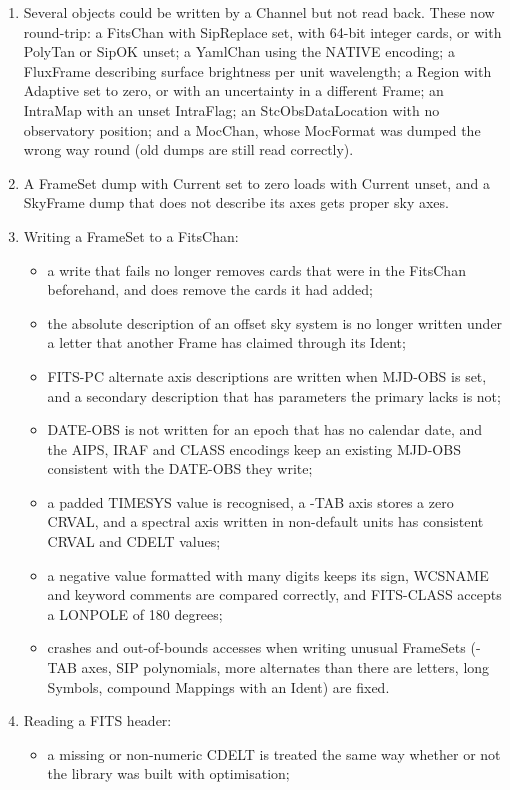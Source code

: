 \documentclass[twoside,11pt]{starlink}
\begin{document}
\begin{enumerate}
\item Several objects could be written by a Channel but not read back.
  These now round-trip: a FitsChan with SipReplace set, with 64-bit integer cards, or with PolyTan or SipOK unset; a YamlChan using the NATIVE encoding; a FluxFrame describing surface brightness per unit wavelength; a Region with Adaptive set to zero, or with an uncertainty in a different Frame; an IntraMap with an unset IntraFlag; an StcObsDataLocation with no observatory position; and a MocChan, whose MocFormat was dumped the wrong way round (old dumps are still read correctly).
\item A FrameSet dump with Current set to zero loads with Current unset, and a SkyFrame dump that does not describe its axes gets proper sky axes.
\item Writing a FrameSet to a FitsChan:
  \begin{itemize}
  \item a write that fails no longer removes cards that were in the FitsChan beforehand, and does remove the cards it had added;
  \item the absolute description of an offset sky system is no longer written under a letter that another Frame has claimed through its Ident;
  \item FITS-PC alternate axis descriptions are written when MJD-OBS is set, and a secondary description that has parameters the primary lacks is not;
  \item DATE-OBS is not written for an epoch that has no calendar date, and the AIPS, IRAF and CLASS encodings keep an existing MJD-OBS consistent with the DATE-OBS they write;
  \item a padded TIMESYS value is recognised, a -TAB axis stores a zero CRVAL, and a spectral axis written in non-default units has consistent CRVAL and CDELT values;
  \item a negative value formatted with many digits keeps its sign, WCSNAME and keyword comments are compared correctly, and FITS-CLASS accepts a LONPOLE of 180 degrees;
  \item crashes and out-of-bounds accesses when writing unusual FrameSets (-TAB axes, SIP polynomials, more alternates than there are letters, long Symbols, compound Mappings with an Ident) are fixed.
  \end{itemize}
\item Reading a FITS header:
  \begin{itemize}
  \item a missing or non-numeric CDELT is treated the same way whether or not the library was built with optimisation;

\end{itemize}
\end{enumerate}
\end{document}
